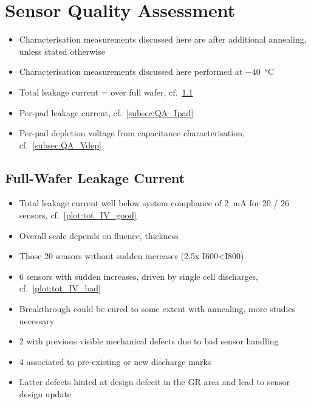 \section{Sensor Quality Assessment}
\label{sec:QA}

\begin{itemize}
	\item Characterisation measurements discussed here are after additional annealing, unless stated otherwise 
	\item Characterisation measurements discussed here performed at \SI{-40}{\celsius}
	\item Total leakage current = over full wafer, cf.~\ref{subsec:QA_Itot}
	\item Per-pad leakage current, cf.~\ref{subsec:QA_Ipad} 
	\item Per-pad depletion voltage from capacitance characterisation, cf.~\ref{subsec:QA_Vdep}
\end{itemize}

\subsection{Full-Wafer Leakage Current}
\label{subsec:QA_Itot}

\begin{itemize}
	\item Total leakage current well below system compliance of \SI{2}{\milli\ampere} for 20 / 26 sensors, cf.~\ref{plot:tot_IV_good}
	\item Overall scale depends on fluence, thickness
	\item Those 20 sensors without sudden increases (2.5x I600<I800).
	\item 6 sensors with sudden increases, driven by single cell discharges, cf.~\ref{plot:tot_IV_bad}
	\item Breakthrough could be cured to some extent with annealing, more studies necessary
	\item 2 with previous visible mechanical defects due to bad sensor handling
	\item 4 associated to pre-existing or new discharge marks
	\item Latter defects hinted at design defecit in the GR area and lead to sensor design update
\end{itemize}

